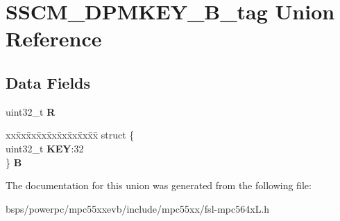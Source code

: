 \hypertarget{unionSSCM__DPMKEY__32B__tag}{}\section{S\+S\+C\+M\+\_\+\+D\+P\+M\+K\+E\+Y\+\_\+B\+\_\+tag Union Reference}
\label{unionSSCM__DPMKEY__32B__tag}
\subsection*{Data Fields}
\begin{DoxyCompactItemize}
\item 
\mbox{\label{unionSSCM__DPMKEY__32B__tag_a9d76690b228ee8c44d4e0e341718172c}} 
uint32\+\_\+t {\bfseries R}
\item 
\mbox{\label{unionSSCM__DPMKEY__32B__tag_ae040e60fabae1e3f1e7487db0f8b9be5}} 
\begin{tabbing}
xx\=xx\=xx\=xx\=xx\=xx\=xx\=xx\=xx\=\kill
struct \{\\
\>uint32\_t {\bfseries KEY}:32\\
\} {\bfseries B}\\

\end{tabbing}\end{DoxyCompactItemize}


The documentation for this union was generated from the following file\+:\begin{DoxyCompactItemize}
\item 
bsps/powerpc/mpc55xxevb/include/mpc55xx/fsl-\/mpc564x\+L.\+h\end{DoxyCompactItemize}
